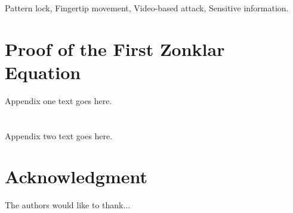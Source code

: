 \documentclass[journal]{IEEEtran}
\begin{document}
\begin{IEEEkeywords}
Pattern lock, Fingertip movement, Video-based attack, Sensitive information.
\end{IEEEkeywords}















%
\IEEEpeerreviewmaketitle





\appendices
\section{Proof of the First Zonklar Equation}
Appendix one text goes here.

\section{}
Appendix two text goes here.


\section*{Acknowledgment}


The authors would like to thank...


\ifCLASSOPTIONcaptionsoff
  \newpage
\fi




\balance


%
%
\end{document}
